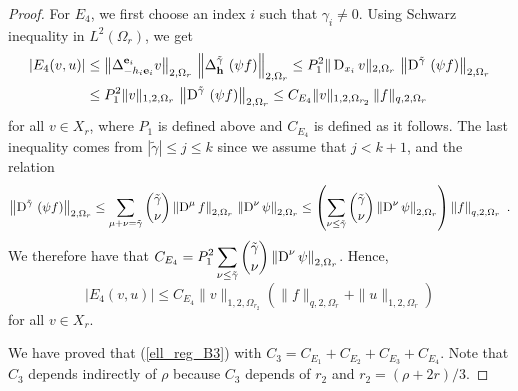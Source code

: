 \begin{proof}
For $E_4$, we first choose an index $i$ such that $\gamma_i \neq 0$.
Using Schwarz inequality in $\displaystyle L^2(\Omega_r)$, we get
\begin{align*}
\left| E_4(v,u) \right| &\leq
\left\| \Delta_{-h_i \mathbf{e}_i}^{\mathbf{e}_i} v \right\|_{2,\Omega_r} \,
\left\| \Delta_{\mathbf{h}}^{\tilde{\gamma}}\,\left( \psi f \right)
\right\|_{2,\Omega_r}
\leq P_1^2 \|\operatorname{D}_{x_i} v \|_{2,\Omega_r} \,
\left\| \operatorname{D}^{\tilde{\gamma}}\,\left( \psi f \right) \right\|_{2,\Omega_r} \\
&\leq P_1^2 \|v \|_{1,2,\Omega_r} \,
\left\| \operatorname{D}^{\tilde{\gamma}}\,\left( \psi f \right) \right\|_{2,\Omega_r}
\leq C_{E_4} \|v \|_{1,2,\Omega_{r_2}} \, \| f \|_{q,2,\Omega_r}
\end{align*}
for all $v \in X_r$, where $P_1$ is defined above and $C_{E_4}$ is
defined as it follows.  The last inequality comes from
$|\tilde{\gamma}| \leq j \leq k$ since 
we assume that $j < k+1$, and the relation
\[
\left\| \operatorname{D}^{\tilde{\gamma}}\,\left( \psi f \right) \right\|_{2,\Omega_r}
\leq \sum_{\mu+\nu=\tilde{\gamma}} \binom{\tilde{\gamma}}{\nu}
\left\| \operatorname{D}^{\mu} f \right\|_{2,\Omega_r}\,
\left\|\operatorname{D}^{\nu} \psi \right\|_{2,\Omega_r}
\leq \left( \sum_{\nu \leq\tilde{\gamma}} \binom{\tilde{\gamma}}{\nu}
\left\|\operatorname{D}^{\nu} \psi \right\|_{2,\Omega_r} \right)
\left\| f \right\|_{q,2,\Omega_r} \ .
\]
We therefore have that $\displaystyle C_{E_4} = P_1^2 
\sum_{\nu \leq\tilde{\gamma}} \binom{\tilde{\gamma}}{\nu}
\left\|\operatorname{D}^{\nu} \psi \right\|_{2,\Omega_r}$.  Hence,
\[
\left| E_4(v,u) \right| \leq C_{E_4} \|v\|_{1,2,\Omega_{r_2}}
\left( \|f\|_{q,2,\Omega_r} + \|u\|_{1,2,\Omega_r} \right)
\]
for all $v \in X_r$.

We have proved that (\ref{ell_reg_B3}) with
$C_3 = C_{E_1} + C_{E_2} + C_{E_3} + C_{E_4}$.  Note that $C_3$
depends indirectly of $\rho$ because $C_3$ depends of $r_2$ and
$r_2 = (\rho + 2r)/3$.


\end{proof}

